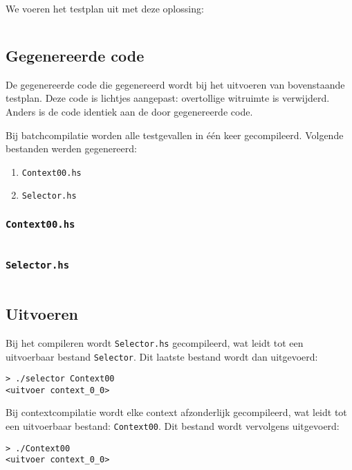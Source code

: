 We voeren het testplan uit met deze oplossing:

\inputminted{haskell}{sources/echo-function/correct.hs}

\subsection{Gegenereerde code}\label{subsec:echo-function-haskell-gegenereerde-code}

De gegenereerde code die gegenereerd wordt bij het uitvoeren van bovenstaande testplan.
Deze code is lichtjes aangepast: overtollige witruimte is verwijderd.
Anders is de code identiek aan de door \tested{} gegenereerde code.

Bij batchcompilatie worden alle testgevallen in één keer gecompileerd.
Volgende bestanden werden gegenereerd:

\begin{enumerate}
    \item \texttt{Context00.hs}
    \item \texttt{Selector.hs}
\end{enumerate}

\subsubsection{\texttt{Context00.hs}}

\inputminted{haskell}{sources/echo-function/Context00.hs}

\subsubsection{\texttt{Selector.hs}}

\inputminted{haskell}{sources/echo-function/Selector.hs}

\subsection{Uitvoeren}\label{subsec:echo-function-haskell-uitvoeren}

Bij het compileren wordt \texttt{Selector.hs} gecompileerd, wat leidt tot een uitvoerbaar bestand \texttt{Selector}.
Dit laatste bestand wordt dan uitgevoerd:

\begin{verbatim}
> ./selector Context00
<uitvoer context_0_0>
\end{verbatim}


Bij contextcompilatie wordt elke context afzonderlijk gecompileerd, wat leidt tot een uitvoerbaar bestand: \texttt{Context00}.
Dit bestand wordt vervolgens uitgevoerd:

\begin{verbatim}
> ./Context00
<uitvoer context_0_0>
\end{verbatim}
